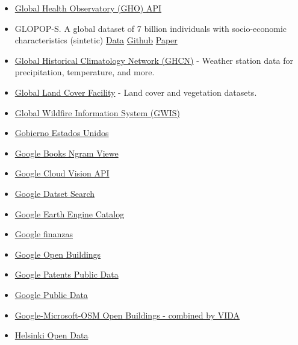 \documentclass[
]{article}
\begin{document}
\begin{itemize}
{  Flood Database v1 (2000-2018)}
\item
  \href{https://www.who.int/data/gho/info/gho-odata-api}{Global Health
  Observatory (GHO) API}
\item
  GLOPOP-S. A global dataset of 7 billion individuals with
  socio-economic characteristics (sintetic)
  \href{https://dataverse.harvard.edu/dataset.xhtml?persistentId=doi:10.7910/DVN/KJC3RH}{Data}
  \href{https://github.com/VU-IVM/GLOPOP-S}{Github}
  \href{https://www.nature.com/articles/s41597-024-03864-2}{Paper}
\item
  \href{https://www.ncei.noaa.gov/products/land-based-station/global-historical-climatology-network-daily}{Global
  Historical Climatology Network (GHCN)} - Weather station data for
  precipitation, temperature, and more.
\item
  \href{https://www.un-spider.org/links-and-resources/data-sources/global-land-cover-facility-university-maryland-nasa-gofc-gold}{Global
  Land Cover Facility} - Land cover and vegetation datasets.
\item
  \href{https://gwis.jrc.ec.europa.eu/}{Global Wildfire Information
  System (GWIS)}
\item
  \href{http://www.data.gov/}{Gobierno Estados Unidos}
\item
  \href{http://storage.googleapis.com/books/ngrams/books/datasetsv2.html}{Google
  Books Ngram Viewe}
\item
  \href{https://cloud.google.com/vision/}{Google Cloud Vision API}
\item
  \href{https://datasetsearch.research.google.com/}{Google Datset
  Search}
\item
  \href{https://github.com/opengeos/Earth-Engine-Catalog}{Google Earth
  Engine Catalog}
\item
  \href{http://www.google.com/finance/}{Google finanzas}
\item
  \href{https://sites.research.google/gr/open-buildings/}{Google Open
  Buildings}
\item
  \href{https://console.cloud.google.com/marketplace/product/google_patents_public_datasets/google-patents-public-data}{Google
  Patents Public Data}
\item
  \href{https://www.google.com/publicdata/directory}{Google Public Data}
\item
  \href{https://beta.source.coop/repositories/vida/google-microsoft-osm-open-buildings/description/}{Google-Microsoft-OSM
  Open Buildings - combined by VIDA}
\item
  \href{http://www.hri.fi/en/}{Helsinki Open Data}

\end{itemize}
\end{document}
